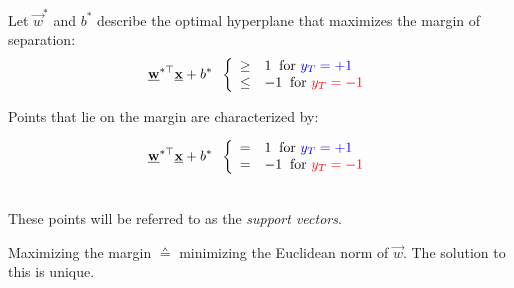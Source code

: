 \begin{frame}\frametitle{\subsecname}
\begin{minipage}{6cm}
Let $\vec w^{*}$ and $b^{*}$ describe the optimal hyperplane that maximizes the margin of separation:
    \begin{equation}
    \vec w^{*\top} \vec x + b^{*} \;\;
    \left \{ \begin{array}{ll}
					\ge& 1 \;\;\text{for } {\color{blue}y_{T} = +1}\\
					\le& -1 \;\;\text{for } {\color{red}y_{T} = -1}
				\end{array} \right.  
    \end{equation}
    
    Points that lie on the margin are characterized by:
    
    \begin{equation}
    \vec w^{*\top} \vec x + b^{*} \;\;
    \left \{ \begin{array}{ll}
					=& 1 \;\;\text{for } {\color{blue}y_{T} = +1}\\
					=& -1 \;\;\text{for } {\color{red}y_{T} = -1}
				\end{array} \right.  
    \end{equation}
    
       

\end{minipage}\\

    These points will be referred to as the \emph{support vectors}.
    
    Maximizing the margin $\corresponds$ minimizing the Euclidean norm of $\vec w$. The solution to this is unique.

\end{frame}

